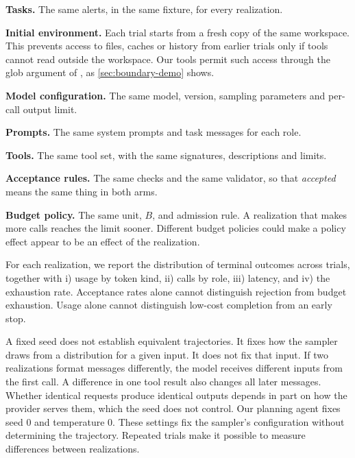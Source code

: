 \bi

\item \textbf{Tasks.} The same alerts, in the same fixture, for every realization.

\item \textbf{Initial environment.} Each trial starts from a fresh copy of the same workspace.
This prevents access to files, caches or history from earlier trials only if tools cannot read
outside the workspace. Our tools permit such access through the glob argument of
, as \cref{sec:boundary-demo} shows.

\item \textbf{Model configuration.} The same model, version, sampling parameters and per-call output
limit.

\item \textbf{Prompts.} The same system prompts and task messages for each role.

\item \textbf{Tools.} The same tool set, with the same signatures, descriptions and limits.

\item \textbf{Acceptance rules.} The same checks and the same validator, so that \emph{accepted}
means the same thing in both arms.

\item \textbf{Budget policy.} The same unit, $B$, and admission rule. A realization that makes more
calls reaches the limit sooner. Different budget policies could make a policy effect appear to be
an effect of the realization.

\ei

For each realization, we report the distribution of terminal outcomes across trials, together
with i) usage by token kind, ii) calls by role, iii) latency, and iv) the exhaustion rate. Acceptance
rates alone cannot distinguish rejection from budget exhaustion. Usage alone cannot distinguish
low-cost completion from an early stop.

A fixed seed does not establish equivalent trajectories. It fixes how the sampler draws from a
distribution for a given input. It does not fix that input. If two realizations format messages
differently, the model receives different inputs from the first call. A difference in one tool
result also changes all later messages. Whether identical requests produce identical outputs
depends in part on how the provider serves them, which the seed does not control. Our planning
agent fixes seed 0 and temperature 0. These settings fix the sampler's configuration without
determining the trajectory. Repeated trials make it possible to measure differences between
realizations.

